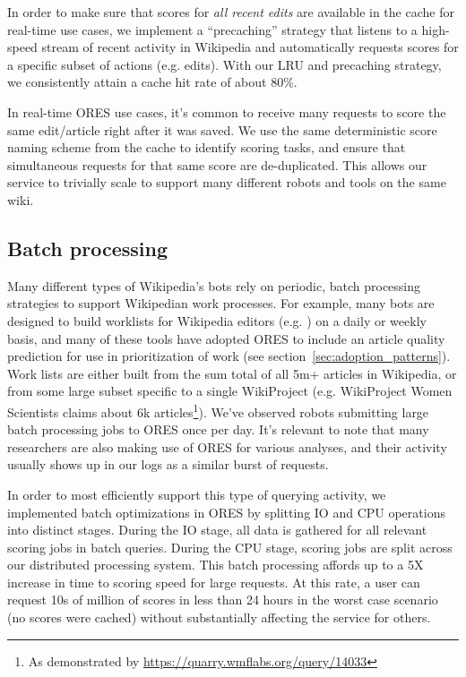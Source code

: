 In order to make sure that scores for \emph{all recent edits} are available in the cache for real-time use cases, we implement a ``precaching'' strategy that listens to a high-speed stream of recent activity in Wikipedia and automatically requests scores for a specific subset of actions (e.g. edits).  With our LRU and precaching strategy, we consistently attain a cache hit rate of about 80\%.

In real-time ORES use cases, it's common to receive many requests to score the same edit/article right after it was saved.  We use the same deterministic score naming scheme from the cache to identify scoring tasks, and ensure that simultaneous requests for that same score are de-duplicated.  This allows our service to trivially scale to support many different robots and tools on the same wiki.

\subsection{Batch processing}
Many different types of Wikipedia's bots rely on periodic, batch processing strategies to support Wikipedian work processes\cite{geiger2011lives}.  For example, many bots are designed to build worklists for Wikipedia editors (e.g. \cite{cosley2007suggestbot}) on a daily or weekly basis, and many of these tools have adopted ORES to include an article quality prediction for use in prioritization of work (see section~\ref{sec:adoption_patterns}).  Work lists are either built from the sum total of all 5m+ articles in Wikipedia, or from some large subset specific to a single WikiProject (e.g. WikiProject Women Scientists claims about 6k articles\footnote{As demonstrated by \url{https://quarry.wmflabs.org/query/14033}}).  We've observed robots submitting large batch processing jobs to ORES once per day.  It's relevant to note that many researchers are also making use of ORES for various analyses, and their activity usually shows up in our logs as a similar burst of requests.

In order to most efficiently support this type of querying activity, we implemented batch optimizations in ORES by splitting IO and CPU operations into distinct stages.  During the IO stage, all data is gathered for all relevant scoring jobs in batch queries.  During the CPU stage, scoring jobs are split across our distributed processing system.  This batch processing affords up to a 5X increase in time to scoring speed for large requests\cite{sarabadani2017building}.  At this rate, a user can request 10s of million of scores in less than 24 hours in the worst case scenario (no scores were cached) without substantially affecting the service for others.
